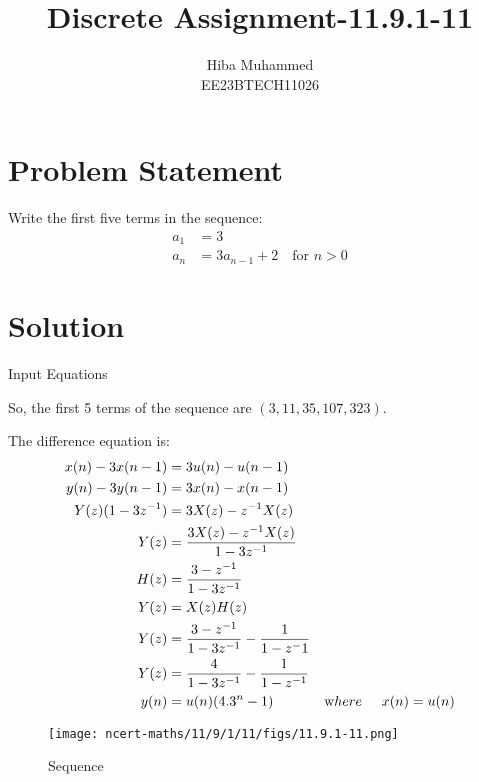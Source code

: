\documentclass[12pt]{article}
\title{Discrete Assignment-11.9.1-11}
\author{Hiba Muhammed \\
        EE23BTECH11026}
\date{}
\begin{document}
\maketitle

\section*{Problem Statement}
Write the first five terms in the sequence:
\begin{align}
a_{1}  &= 3 \\
a_{n}  &= 3a_{n-1} + 2 \quad \text{for } n > 0
\end{align}

\section*{Solution}
\fi
\begin{table}[h]
  \centering
  
  \caption{Input Equations}
  \label{tab:input-equations}
\end{table}

So, the first 5 terms of the sequence are \( (3, 11, 35, 107, 323) \).

The difference equation is:
\begin{align}
x(n) - 3x(n-1) &= 3u(n) - u(n-1) \\
y(n) - 3y(n-1) &= 3x(n) - x(n-1)\\
Y(z)(1 - 3z^{-1}) &= 3X(z) - z^{-1}X(z) \\
Y(z) &= \frac{3X(z) - z^{-1}X(z)}{1 - 3z^{-1}}\\
H(z) &= \frac{3 - z^{-1}}{1 - 3z^{-1}}\\
Y(z) &=X(z)H(z) \\
Y(z)&=\frac{3 - z^{-1}}{1-3z^{-1}}-\frac{1}{1-z^-1}\\
Y(z)&=\frac{4}{1-3z^{-1}}-\frac{1}{1-z^{-1}}\\
y(n)&=u(n)(4.3^{n}-1) &\text where \hspace{0.5cm}x(n)=u(n)
\end{align}

\begin{figure}[h]
    \centering
    \texttt{[image: ncert-maths/11/9/1/11/figs/11.9.1-11.png]}
    \caption{Sequence}
\end{figure}

\end{document}
